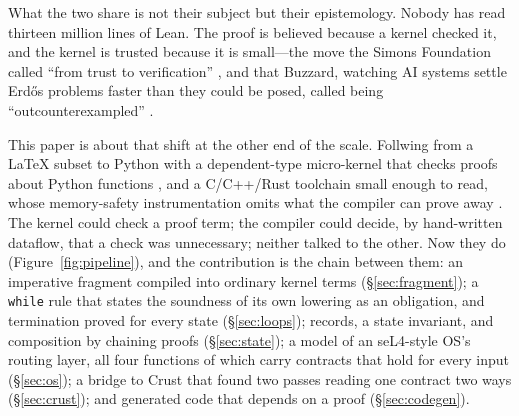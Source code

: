 \documentclass[11pt]{article}
\newcommand{\code}[1]{\texttt{#1}}
\begin{document}
What the two share is not their subject but their epistemology. Nobody has
read thirteen million lines of Lean. The proof is believed because a kernel
checked it, and the kernel is trusted because it is small---the move the
Simons Foundation called ``from trust to verification'' \cite{simons2026},
and that Buzzard, watching AI systems settle Erd\H{o}s problems faster than
they could be posed, called being ``outcounterexampled''
\cite{buzzard2026counter}.

This paper is about that shift at the other end of the scale. 
Follwing from a \LaTeX{} subset to Python
with a dependent-type micro-kernel that checks proofs about Python functions
\cite{hartshorn2026rosetta}, and a C/C++/Rust toolchain small enough to read,
whose memory-safety instrumentation omits what the compiler can prove away
\cite{hartshorn2026memsafe,hartshorn2026subtraction}. The kernel could check
a proof term; the compiler could decide, by hand-written dataflow, that a
check was unnecessary; neither talked to the other. Now they do
(Figure~\ref{fig:pipeline}), and the contribution is the chain between them:
an imperative fragment compiled into ordinary kernel terms
(\S\ref{sec:fragment}); a \code{while} rule that states the soundness of its
own lowering as an obligation, and termination proved for every state
(\S\ref{sec:loops}); records, a state invariant, and composition by chaining
proofs (\S\ref{sec:state}); a model of an seL4-style OS's routing layer, all
four functions of which carry contracts that hold for every input
(\S\ref{sec:os}); a bridge to Crust that found two passes reading one contract
two ways (\S\ref{sec:crust}); and generated code that depends on a proof
(\S\ref{sec:codegen}).
\end{document}
